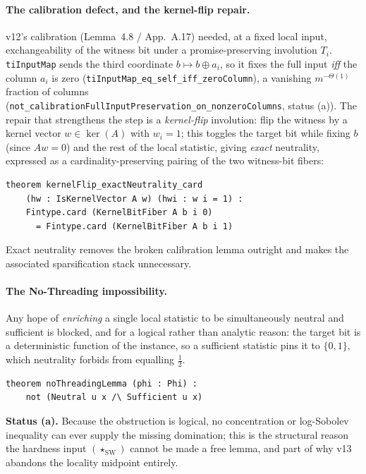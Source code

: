 \documentclass[11pt]{article}
\theoremstyle{definition}
\newcommand{\StarSW}{(\star_{\mathrm{SW}})}
\begin{document}
\paragraph{The calibration defect, and the kernel-flip repair.} v12's calibration
(Lemma~4.8 / App.~A.17) needed, at a fixed local input, exchangeability of the
witness bit under a promise-preserving involution $T_i$. \texttt{tiInputMap} sends
the third coordinate $b\mapsto b\oplus a_i$, so it fixes the full input
\emph{iff} the column $a_i$ is zero
(\texttt{tiInputMap\_eq\_self\_iff\_zeroColumn}), a vanishing $m^{-\Theta(1)}$
fraction of columns (\texttt{not\_calibrationFullInputPreservation\_on\_nonzeroColumns},
status (a)). The repair that strengthens the step is a \emph{kernel-flip}
involution: flip the witness by a kernel vector $w\in\ker(A)$ with $w_i=1$; this
toggles the target bit while fixing $b$ (since $Aw=0$) and the rest of the local
statistic, giving \emph{exact} neutrality, expressed as a cardinality-preserving
pairing of the two witness-bit fibers:
\begin{lstlisting}
theorem kernelFlip_exactNeutrality_card
    (hw : IsKernelVector A w) (hwi : w i = 1) :
    Fintype.card (KernelBitFiber A b i 0)
      = Fintype.card (KernelBitFiber A b i 1)
\end{lstlisting}
Exact neutrality removes the broken calibration lemma outright and makes the
associated sparsification stack unnecessary.

\paragraph{The No-Threading impossibility.} Any hope of \emph{enriching} a single
local statistic to be simultaneously neutral and sufficient is blocked, and for a
logical rather than analytic reason: the target bit is a deterministic function of
the instance, so a sufficient statistic pins it to $\{0,1\}$, which neutrality
forbids from equalling $\tfrac12$.
\begin{lstlisting}
theorem noThreadingLemma (phi : Phi) :
    not (Neutral u x /\ Sufficient u x)
\end{lstlisting}
\textbf{Status (a).} Because the obstruction is logical, no concentration or
log-Sobolev inequality can ever supply the missing domination; this is the
structural reason the hardness input $\StarSW$ cannot be made a free lemma, and
part of why v13 abandons the locality midpoint entirely.
\end{document}
